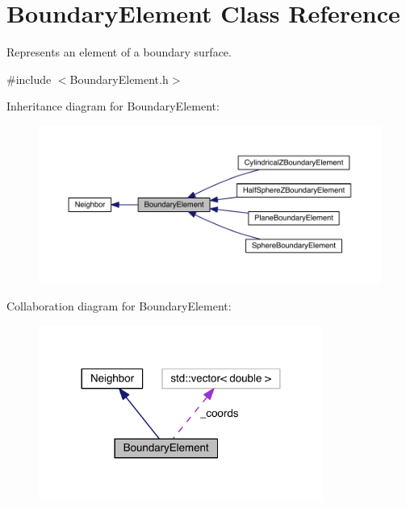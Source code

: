 \hypertarget{classBoundaryElement}{\section{Boundary\+Element Class Reference}
\label{classBoundaryElement}
}


Represents an element of a boundary surface.  




{\ttfamily \#include $<$Boundary\+Element.\+h$>$}



Inheritance diagram for Boundary\+Element\+:
\nopagebreak
\begin{figure}[H]
\begin{center}
\leavevmode
\includegraphics[width=350pt]{classBoundaryElement__inherit__graph}
\end{center}
\end{figure}


Collaboration diagram for Boundary\+Element\+:\nopagebreak
\begin{figure}[H]
\begin{center}
\leavevmode
\includegraphics[width=264pt]{classBoundaryElement__coll__graph}
\end{center}
\end{figure}
